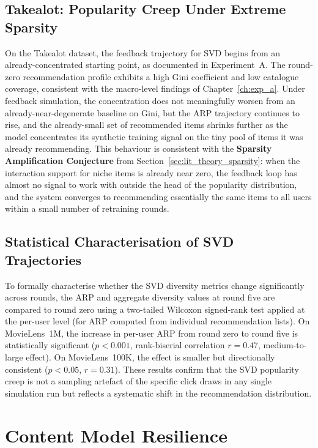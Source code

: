 \documentclass[11pt,a4paper]{report}
\begin{document}
\subsection*{Takealot: Popularity Creep Under Extreme Sparsity}

On the Takealot dataset, the feedback trajectory for SVD begins from an already-concentrated starting point, as documented in Experiment~A. The round-zero recommendation profile exhibits a high Gini coefficient and low catalogue coverage, consistent with the macro-level findings of Chapter~\ref{ch:exp_a}. Under feedback simulation, the concentration does not meaningfully worsen from an already-near-degenerate baseline on Gini, but the ARP trajectory continues to rise, and the already-small set of recommended items shrinks further as the model concentrates its synthetic training signal on the tiny pool of items it was already recommending. This behaviour is consistent with the \textbf{Sparsity Amplification Conjecture} from Section~\ref{sec:lit_theory_sparsity}: when the interaction support for niche items is already near zero, the feedback loop has almost no signal to work with outside the head of the popularity distribution, and the system converges to recommending essentially the same items to all users within a small number of retraining rounds.

\subsection*{Statistical Characterisation of SVD Trajectories}

To formally characterise whether the SVD diversity metrics change significantly across rounds, the ARP and aggregate diversity values at round five are compared to round zero using a two-tailed Wilcoxon signed-rank test applied at the per-user level (for ARP computed from individual recommendation lists). On MovieLens~1M, the increase in per-user ARP from round zero to round five is statistically significant ($p < 0.001$, rank-biserial correlation $r = 0.47$, medium-to-large effect). On MovieLens~100K, the effect is smaller but directionally consistent ($p < 0.05$, $r = 0.31$). These results confirm that the SVD popularity creep is not a sampling artefact of the specific click draws in any single simulation run but reflects a systematic shift in the recommendation distribution.

\section{Content Model Resilience}
\label{sec:expc_content}
\end{document}
